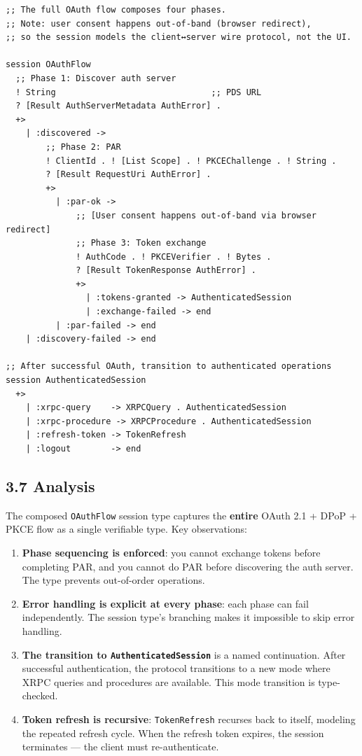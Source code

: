 \documentclass[11pt]{article}
\begin{document}
\begin{verbatim}
;; The full OAuth flow composes four phases.
;; Note: user consent happens out-of-band (browser redirect),
;; so the session models the client↔server wire protocol, not the UI.

session OAuthFlow
  ;; Phase 1: Discover auth server
  ! String                               ;; PDS URL
  ? [Result AuthServerMetadata AuthError] .
  +>
    | :discovered ->
        ;; Phase 2: PAR
        ! ClientId . ! [List Scope] . ! PKCEChallenge . ! String .
        ? [Result RequestUri AuthError] .
        +>
          | :par-ok ->
              ;; [User consent happens out-of-band via browser redirect]
              ;; Phase 3: Token exchange
              ! AuthCode . ! PKCEVerifier . ! Bytes .
              ? [Result TokenResponse AuthError] .
              +>
                | :tokens-granted -> AuthenticatedSession
                | :exchange-failed -> end
          | :par-failed -> end
    | :discovery-failed -> end

;; After successful OAuth, transition to authenticated operations
session AuthenticatedSession
  +>
    | :xrpc-query    -> XRPCQuery . AuthenticatedSession
    | :xrpc-procedure -> XRPCProcedure . AuthenticatedSession
    | :refresh-token -> TokenRefresh
    | :logout        -> end
\end{verbatim}
\subsection{3.7 Analysis}
\label{sec:orge290839}

The composed \texttt{OAuthFlow} session type captures the \textbf{entire} OAuth 2.1 + DPoP +
PKCE flow as a single verifiable type. Key observations:

\begin{enumerate}
\item \textbf{Phase sequencing is enforced}: you cannot exchange tokens before completing
PAR, and you cannot do PAR before discovering the auth server. The type
prevents out-of-order operations.

\item \textbf{Error handling is explicit at every phase}: each phase can fail
independently. The session type's branching makes it impossible to skip
error handling.

\item \textbf{The transition to \texttt{AuthenticatedSession}} is a named continuation. After
successful authentication, the protocol transitions to a new mode where
XRPC queries and procedures are available. This mode transition is
type-checked.

\item \textbf{Token refresh is recursive}: \texttt{TokenRefresh} recurses back to itself,
modeling the repeated refresh cycle. When the refresh token expires, the
session terminates — the client must re-authenticate.
\end{enumerate}
\end{document}
